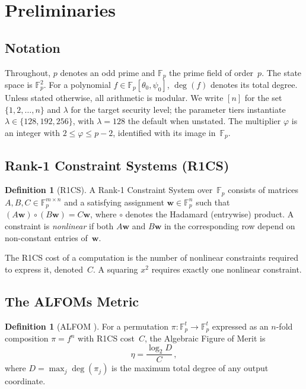 \documentclass[11pt,a4paper]{article}
\theoremstyle{definition}
\newtheorem{definition}[theorem]{Definition}
\newcommand{\Fp}{\mathbb{F}_p}
\begin{document}
\section{Preliminaries}\label{sec:prelim}

\subsection{Notation}\label{sec:prelim:notation}

Throughout, $p$ denotes an odd prime and $\Fp$ the prime field of order~$p$.
The state space is $\Fp^2$. For a polynomial
$f \in \Fp[\theta_0, \psi_0]$, $\deg(f)$ denotes its total degree.
Unless stated otherwise, all arithmetic is modular. We write $[n]$ for the
set $\{1, 2, \ldots, n\}$ and $\lambda$ for the target security
level; the parameter tiers instantiate $\lambda \in \{128, 192,
256\}$, with $\lambda = 128$ the default when unstated. The
multiplier $\varphi$ is an integer with $2 \le \varphi \le p - 2$,
identified with its image in~$\Fp$.


\subsection{Rank-1 Constraint Systems (R1CS)}\label{sec:prelim:r1cs}

\begin{definition}[R1CS]\label{def:r1cs}
A Rank-1 Constraint System over~$\Fp$ consists of matrices
$A, B, C \in \Fp^{m \times n}$ and a satisfying assignment
$\mathbf{w} \in \Fp^n$ such that
$(A\mathbf{w}) \circ (B\mathbf{w}) = C\mathbf{w}$, where $\circ$ denotes
the Hadamard (entrywise) product. A constraint is \emph{nonlinear} if both
$A\mathbf{w}$ and $B\mathbf{w}$ in the corresponding row depend on
non-constant entries of~$\mathbf{w}$.
\end{definition}

The R1CS cost of a computation is the number of nonlinear constraints
required to express it, denoted~$C$. A squaring $x^2$ requires
exactly one nonlinear constraint.


\subsection{The ALFOMs Metric}\label{sec:prelim:alfom}

\begin{definition}[ALFOM {\cite{ALFOMs}}]\label{def:alfom}
For a permutation $\pi\colon \Fp^t \to \Fp^t$ expressed as an $n$-fold
composition $\pi = f^n$ with R1CS cost~$C$, the Algebraic Figure of Merit
is
\[
  \eta = \frac{\log_2 D}{C}\,,
\]
where $D = \max_j \deg(\pi_j)$ is the maximum total degree of any output
coordinate.
\end{definition}
\end{document}
